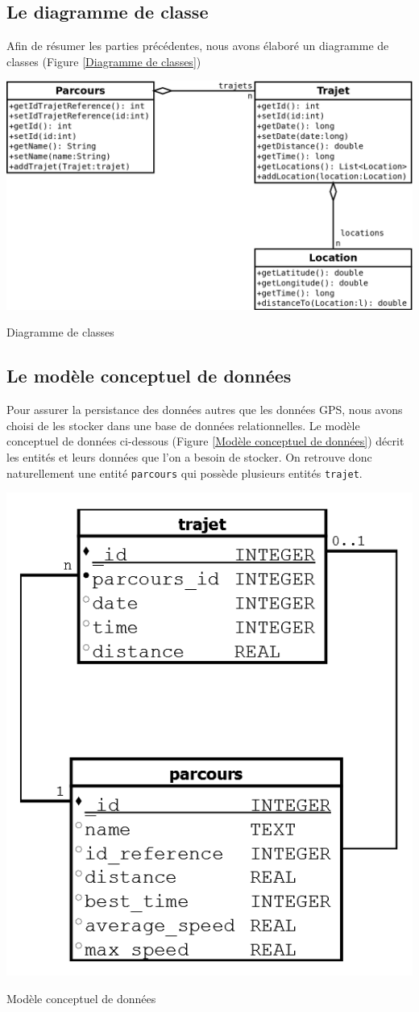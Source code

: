 \subsection{Le diagramme de classe}
Afin de résumer les parties précédentes, nous avons élaboré un diagramme de classes (Figure \ref{Diagramme de classes})
\begin{img}
  \includegraphics[scale=0.4]{img/DiagrammeDeClasse.png}
  \caption{Diagramme de classes}
  \label{Diagramme de classes}
\end{img}

\subsection{Le modèle conceptuel de données}
Pour assurer la persistance des données autres que les données GPS, nous avons choisi de les stocker dans une base de données relationnelles. Le modèle conceptuel de données ci-dessous (Figure \ref{Modèle conceptuel de données}) décrit les entités et leurs données que l'on a besoin de stocker. On retrouve donc naturellement une entité \verb!parcours! qui possède plusieurs entités \verb!trajet!. 

\begin{img}
  \includegraphics[scale=0.3]{img/bdd.png}
  \caption{Modèle conceptuel de données}
  \label{Modèle conceptuel de données}
\end{img}
